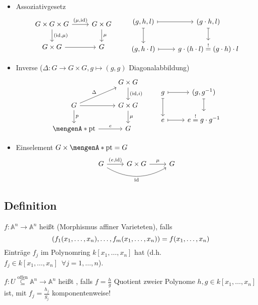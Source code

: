 \begin{itemize}
	\item Assoziativgesetz
	\[
		\begin{tikzcd}
			G \times G \times G \rar{(\mu,\id)} \dar{(\id,\mu)} & G \times G \dar["\mu"] \\
			G \times G \rar & G
		\end{tikzcd}
		\qquad
		\begin{tikzcd}
			(g,h,l) \rar[mapsto] \dar[mapsto]& (g \cdot h, l) \dar[mapsto]\\
			(g, h \cdot l) \rar[mapsto] & g \cdot (h \cdot l) \stackrel{!}{=} (g \cdot h) \cdot l
		\end{tikzcd}
	\]
	\item Inverse ($\Delta : G \to G \times G, g \mapsto (g,g)$ Diagonalabbildung)
	\[
		\begin{tikzcd}
			\mbox{ } & G \times G \dar{(\id, i)} \\
			G \rar \dar["p"]  \urar{\Delta} & G \times G \dar["\mu"] \\
			\set{\mathrm{pt}}  \rar["e"] & G
		\end{tikzcd}
		\qquad
		\begin{tikzcd}
			g \rar[mapsto] \dar[mapsto]& (g, g ^{-1}) \dar[mapsto] \\
			e \rar[mapsto]& e \stackrel{!}{=} g \cdot g ^{-1}
		\end{tikzcd}
	\]
	\item Einselement $G \times \set{\mathrm{pt}} = G $
	\[
		\begin{tikzcd}
			G \rar{(e,\id)} \arrow[bend right, swap]{rr}{\id} & G \times G \rar["\mu"] &  G
		\end{tikzcd}
	\]
\end{itemize}

\subsection{Definition} %
\label{sub:12}
$f : \mathds{A}^n \to \mathds{A}^n$ heißt  (Morphismus affiner Varieteten), falls
\[
	\enbrace*{ f_1 \enbrace*{x_1, \ldots , x_n}, \ldots , f_m(x_1, \ldots ,x_n) } = f(x_1, \ldots , x_n) 
\] 
Einträge $f_j$ im Polynomring $k[x_1, \ldots , x_n]$ hat (d.h. $f_j \in k[x_1, \ldots , x_n] \enspace \forall j=1, \ldots ,n$).

$f : U \stackrel{\text{offen}}{\subseteq} \mathds{A}^n \to \mathds{A}^n$ heißt , falls $f=\frac{h}{g}$ Quotient zweier Polynome 
$h,g \in k[x_1, \ldots , x_n]$ ist, mit $f_j = \frac{h_j}{g_j} $ komponentenweise!

